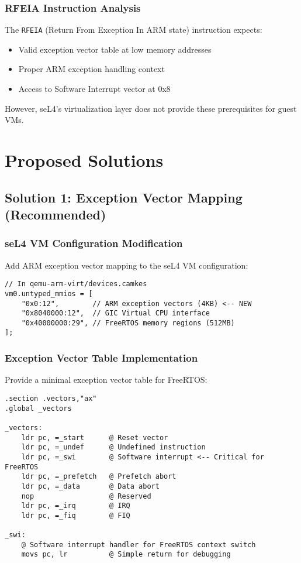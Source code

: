 \documentclass[11pt,a4paper]{article}
\begin{document}
\subsubsection{RFEIA Instruction Analysis}

The \texttt{RFEIA} (Return From Exception In ARM state) instruction expects:
\begin{itemize}
    \item Valid exception vector table at low memory addresses
    \item Proper ARM exception handling context
    \item Access to Software Interrupt vector at 0x8
\end{itemize}

However, seL4's virtualization layer does not provide these prerequisites for guest VMs.

\section{Proposed Solutions}

\subsection{Solution 1: Exception Vector Mapping (Recommended)}

\subsubsection{seL4 VM Configuration Modification}

Add ARM exception vector mapping to the seL4 VM configuration:

\begin{lstlisting}[caption={Enhanced seL4 VM Configuration}]
// In qemu-arm-virt/devices.camkes
vm0.untyped_mmios = [
    "0x0:12",        // ARM exception vectors (4KB) <-- NEW
    "0x8040000:12",  // GIC Virtual CPU interface
    "0x40000000:29", // FreeRTOS memory regions (512MB)
];
\end{lstlisting}

\subsubsection{Exception Vector Table Implementation}

Provide a minimal exception vector table for FreeRTOS:

\begin{lstlisting}[language=ARM,caption={Minimal ARM Exception Vector Table}]
.section .vectors,"ax"
.global _vectors

_vectors:
    ldr pc, =_start      @ Reset vector
    ldr pc, =_undef      @ Undefined instruction
    ldr pc, =_swi        @ Software interrupt <-- Critical for FreeRTOS
    ldr pc, =_prefetch   @ Prefetch abort
    ldr pc, =_data       @ Data abort
    nop                  @ Reserved
    ldr pc, =_irq        @ IRQ
    ldr pc, =_fiq        @ FIQ

_swi:
    @ Software interrupt handler for FreeRTOS context switch
    movs pc, lr          @ Simple return for debugging
\end{lstlisting}
\end{document}
